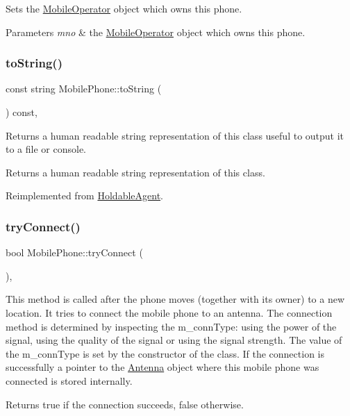 Sets the \hyperlink{class_mobile_operator}{Mobile\+Operator} object which owns this phone. 
\begin{DoxyParams}{Parameters}
{\em mno} & the \hyperlink{class_mobile_operator}{Mobile\+Operator} object which owns this phone. \\
\hline
\end{DoxyParams}
\mbox{\label{class_mobile_phone_a2b7e556d12a43e380786ad0eccf3ce04}} 
\subsubsection{\texorpdfstring{to\+String()}{toString()}}
{\footnotesize\ttfamily const string Mobile\+Phone\+::to\+String (\begin{DoxyParamCaption}{ }\end{DoxyParamCaption}) const\hspace{0.3cm}{\ttfamily [override]}, {\ttfamily [virtual]}}

Returns a human readable string representation of this class useful to output it to a file or console. \begin{DoxyReturn}{Returns}
a human readable string representation of this class. 
\end{DoxyReturn}


Reimplemented from \hyperlink{class_holdable_agent_a2c581226b8994f24b6b2306ae17dbb52}{Holdable\+Agent}.

\mbox{\label{class_mobile_phone_ad91afa811cea8ee124167f5941bcda1b}} 
\subsubsection{\texorpdfstring{try\+Connect()}{tryConnect()}}
{\footnotesize\ttfamily bool Mobile\+Phone\+::try\+Connect (\begin{DoxyParamCaption}{ }\end{DoxyParamCaption})\hspace{0.3cm}{\ttfamily [override]}, {\ttfamily [virtual]}}

This method is called after the phone moves (together with its owner) to a new location. It tries to connect the mobile phone to an antenna. The connection method is determined by inspecting the m\+\_\+conn\+Type\+: using the power of the signal, using the quality of the signal or using the signal strength. The value of the m\+\_\+conn\+Type is set by the constructor of the class. If the connection is successfully a pointer to the \hyperlink{class_antenna}{Antenna} object where this mobile phone was connected is stored internally. \begin{DoxyReturn}{Returns}
true if the connection succeeds, false otherwise. 
\end{DoxyReturn}



